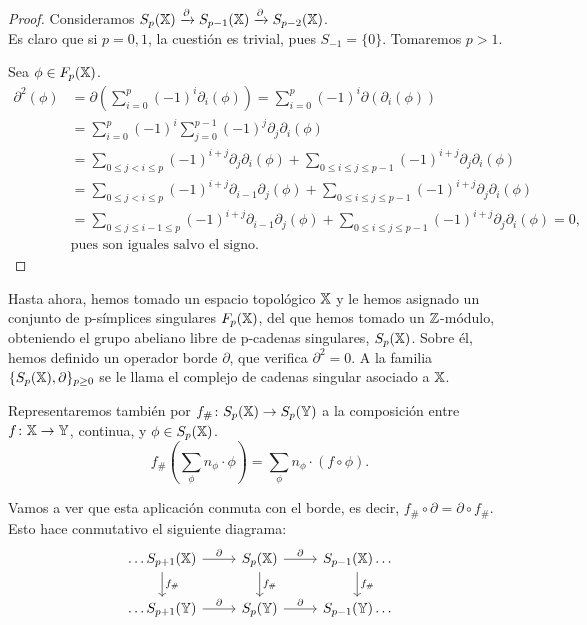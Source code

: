 \begin{proof}
  Consideramos $S_p({\mathbb X}) \xrightarrow{\partial} S_{p-1}({\mathbb X}) \xrightarrow{\partial} S_{p-2}({\mathbb X})$. \\
  Es claro que si $p = 0, 1$, la cuestión es trivial, pues $S_{-1} = \{0\}$. Tomaremos $p > 1$.

  Sea $\phi \in F_{p}({\mathbb X})$.
  \begin{align*}
    \partial^2(\phi) &= \partial(\sum_{i = 0}^p (-1)^i \partial_i(\phi)) = \sum_{i = 0}^p (-1)^i \partial(\partial_i(\phi)) \\
                     &= \sum_{i = 0}^p (-1)^i \sum_{j = 0}^{p-1} (-1)^j \partial_j \partial_i(\phi) \\
                     &= \sum_{0 \leq j < i \leq p} (-1)^{i + j} \partial_j \partial_i(\phi)
                        + \sum_{0 \leq i \leq j \leq p-1} (-1)^{i + j} \partial_j \partial_i(\phi) \\
                     &= \sum_{0 \leq j < i \leq p} (-1)^{i + j} \partial_{i-1} \partial_j(\phi)
                        + \sum_{0 \leq i \leq j \leq p-1} (-1)^{i + j} \partial_j \partial_i(\phi) \\
                     &= \sum_{0 \leq j \leq i-1 \leq p} (-1)^{i + j} \partial_{i-1} \partial_j(\phi)
                        + \sum_{0 \leq i \leq j \leq p-1} (-1)^{i + j} \partial_j \partial_i(\phi) = 0,\\
                     &\text{pues son iguales salvo el signo.}
  \end{align*}
\end{proof}

Hasta ahora, hemos tomado un espacio topológico ${\mathbb X}$ y le hemos asignado un conjunto de p-símplices singulares $F_{p}({\mathbb X})$, del que
hemos tomado un $\mathbb{Z}$-módulo, obteniendo el grupo abeliano libre de p-cadenas singulares, $S_p({\mathbb X})$. Sobre él, hemos definido un
operador borde $\partial$, que verifica $\partial^2 = 0$. A la familia $\{S_p({\mathbb X}), \partial\}_{p \geq 0}$ se le llama el complejo de cadenas
singular asociado a ${\mathbb X}$.

Representaremos también por $f_\# \colon S_p({\mathbb X}) \to S_p({\mathbb Y})$ a la composición entre
$f \colon {\mathbb X} \to {\mathbb Y}$, continua, y $\phi \in S_p({\mathbb X})$.
\[ f_\#(\sum_\phi n_\phi \cdot \phi) = \sum_\phi n_\phi \cdot (f \circ \phi). \]

Vamos a ver que esta aplicación conmuta con el borde, es decir, $f_\# \circ \partial = \partial \circ f_\#$. Esto hace conmutativo el siguiente diagrama:
\[
  \begin{tikzcd}
    \dots S_{p+1}(\X) \arrow{r}{\partial} \arrow{d}{f_\#} & S_p(\X) \arrow{r}{\partial} \arrow{d}{f_\#} & S_{p-1}(\X) \arrow{d}{f_\#} \dots \\
    \dots S_{p+1}(\Y) \arrow{r}{\partial}                 & S_p(\Y) \arrow{r}{\partial}                 & S_{p-1}(\Y) \dots
  \end{tikzcd}
\]

